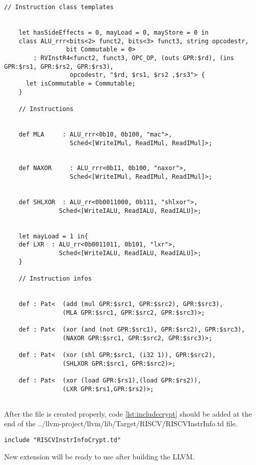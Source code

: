 \begin{lstlisting}[caption={RISCVInstrInfoCrypt.td file},label={lst:crypt_file}]
	// Instruction class templates
	

	let hasSideEffects = 0, mayLoad = 0, mayStore = 0 in
	class ALU_rrr<bits<2> funct2, bits<3> funct3, string opcodestr,
				 bit Commutable = 0>
		: RVInstR4<funct2, funct3, OPC_OP, (outs GPR:$rd), (ins GPR:$rs1, GPR:$rs2, GPR:$rs3),
				  opcodestr, "$rd, $rs1, $rs2 ,$rs3"> {
	  let isCommutable = Commutable;
	}
	
	// Instructions
	
	
	def MLA     : ALU_rrr<0b10, 0b100, "mac">,
				  Sched<[WriteIMul, ReadIMul, ReadIMul]>;
	
	
	def NAXOR     : ALU_rrr<0b11, 0b100, "naxor">,
				  Sched<[WriteIMul, ReadIMul, ReadIMul]>;
	
	
	def SHLXOR  : ALU_rr<0b0011000, 0b111, "shlxor">,
			   Sched<[WriteIALU, ReadIALU, ReadIALU]>;
	
	
	let mayLoad = 1 in{
	def LXR  : ALU_rr<0b0011011, 0b101, "lxr">,
			   Sched<[WriteIALU, ReadIALU, ReadIALU]>;
	}
	
	// Instruction infos
	
	
	def : Pat<  (add (mul GPR:$src1, GPR:$src2), GPR:$src3),
				(MLA GPR:$src1, GPR:$src2, GPR:$src3)>;
	
	def : Pat<  (xor (and (not GPR:$src1), GPR:$src2), GPR:$src3),
				(NAXOR GPR:$src1, GPR:$src2, GPR:$src3)>;
	
	def : Pat<  (xor (shl GPR:$src1, (i32 1)), GPR:$src2),
				(SHLXOR GPR:$src1, GPR:$src2)>;
	
	def : Pat<  (xor (load GPR:$rs1),(load GPR:$rs2)),
				(LXR GPR:$rs1,GPR:$rs2)>;
	
\end{lstlisting}

After the file is created properly, code \ref{lst:includecrypt} should be added at the end of the ../llvm-project/llvm/lib/Target/RISCV/RISCVInstrInfo.td file.
\begin{lstlisting}[caption={Include line},label={lst:includecrypt}]
include "RISCVInstrInfoCrypt.td"
\end{lstlisting}
New extension will be ready to use after building the LLVM.
\newpage